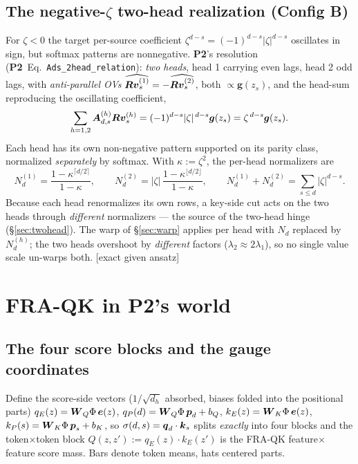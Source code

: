 \documentclass{article}
\newcommand{\gb}{\boldsymbol{g}}
\newcommand{\qb}{\boldsymbol{q}}
\newcommand{\Wq}{\boldsymbol{W}_Q}
\newcommand{\Wk}{\boldsymbol{W}_K}
\newcommand{\htag}[1]{{\normalfont\sffamily\footnotesize[#1]}}
\newcommand{\Ptwo}{\textbf{P2}}
\begin{document}
\subsection{The negative-$\zeta$ two-head realization (Config B)}\label{sec:tworealize}

For $\zeta<0$ the target per-source coefficient $\zeta^{d-s}=(-1)^{d-s}|\zeta|^{d-s}$
oscillates in sign, but softmax patterns are nonnegative. \Ptwo's resolution (\Ptwo\
Eq.~\texttt{Ads\_2head\_relation}): \emph{two heads}, head 1 carrying even lags,
head 2 odd lags, with \emph{anti-parallel OVs}
$\widehat{\boldsymbol{R}\boldsymbol{v}^{(1)}_s}=-\widehat{\boldsymbol{R}\boldsymbol{v}^{(2)}_s}$, both $\propto\gb(z_s)$, and the
head-sum reproducing the oscillating coefficient,
\begin{equation}\label{eq:twohead-realize}
\sum_{h=1,2}\Ab^{(h)}_{d,s}\Rb\vb^{(h)}_s=(-1)^{d-s}|\zeta|^{\,d-s}\gb(z_s)
=\zeta^{\,d-s}\gb(z_s).
\end{equation}
Each head has its own non-negative pattern supported on its parity class,
normalized \emph{separately} by softmax. With $\kappa:=\zeta^2$, the per-head
normalizers are
\begin{equation}\label{eq:Ndhead}
N_d^{(1)}=\frac{1-\kappa^{\lceil d/2\rceil}}{1-\kappa},\qquad
N_d^{(2)}=|\zeta|\,\frac{1-\kappa^{\lfloor d/2\rfloor}}{1-\kappa},\qquad
N_d^{(1)}+N_d^{(2)}=\sum_{s\le d}|\zeta|^{d-s}.
\end{equation}
Because each head renormalizes its own rows, a key-side cut acts on the two heads
through \emph{different} normalizers --- the source of the two-head hinge
(\S\ref{sec:twohead}). The warp of \S\ref{sec:warp} applies per head with $N_d$
replaced by $N_d^{(h)}$; the two heads overshoot by \emph{different} factors
($\lambda_2\approx2\lambda_1$), so no single value scale un-warps both.
\htag{exact given ansatz}

\section{FRA-QK in \Ptwo's world}\label{sec:qk}

\subsection{The four score blocks and the gauge coordinates}\label{sec:blocks}

Define the score-side vectors ($1/\sqrt{d_h}$ absorbed, biases folded into the
positional parts) $q_E(z)=\Wq\Phi\,\eb(z)$, $q_P(d)=\Wq\Phi\,\pb_d+b_Q$,
$k_E(z)=\Wk\Phi\,\eb(z)$, $k_P(s)=\Wk\Phi\,\pb_s+b_K$, so $\sigma(d,s)=\qb_d\cdot\kb_s$
splits \emph{exactly} into four blocks and the token$\times$token block
$Q(z,z'):=q_E(z)\cdot k_E(z')$ is the FRA-QK feature$\times$feature score mass. Bars
denote token means, hats centered parts.
\end{document}
